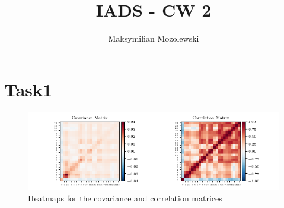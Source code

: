 \documentclass{report}
\begin{document}
\title{IADS - CW 2}
\author{Maksymilian Mozolewski}
\maketitle
\pagebreak
\section{Task1}

\begin{figure}
    \includegraphics[scale=1,left]{Years/Year2/Semester2/Learning/CW/python_code/correlation.png} 
    \caption{Heatmaps for the covariance and correlation matrices}
\label{fig:wrapfig}
\end{figure}
\end{document}
